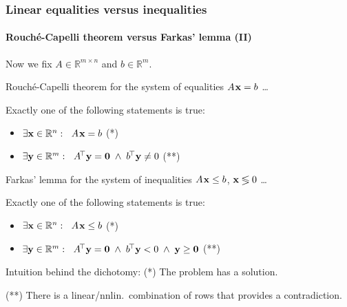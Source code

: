 \documentclass{beamer}
\renewcommand{\.}{\hskip .75pt}
\DeclareMathOperator{\aand}{~\wedge~}
\begin{document}
\begin{frame}
	\frametitle{Linear equalities versus inequalities}
	\framesubtitle{Rouché-Capelli theorem versus Farkas' lemma (II)}
	
	Now we fix $A \in \mathbb{R}^{m \times n}$ and $b \in \mathbb{R}^{m}$.
	\bigskip
	
	{ \color{dred}
		Rouché-Capelli theorem for the system of equalities $A\. \bold{x} = b$ \dots
		
		Exactly one of the following statements is true:
	}
	\begin{itemize} \color{dred}
		\item $\exists \bold{x} \in \mathbb{R}^{n} : \ \; A\. \bold{x} = b$ \hfill\hbox{\footnotesize(*)\:\qquad}
		\item $\exists \bold{y} \in \mathbb{R}^{m} : \ \; A^{\!\top} \bold{y} = \bold{0} \aand b^{\!\top} \bold{y} \neq 0$ \hfill\hbox{\footnotesize(**)\qquad}
	\end{itemize}
	\medskip
	
	{ \color{dblue}
		Farkas' lemma for the system of inequalities $A\. \bold{x} \le b$, $\bold{x} \lessgtr 0$ \dots
		
		Exactly one of the following statements is true:
	}
	\begin{itemize} \color{dblue}
		\item $\exists \bold{x} \in \mathbb{R}^{n} : \ \; A\. \bold{x} \le b$ \hfill\hbox{\footnotesize(*)\:\qquad}
		\item $\exists \bold{y} \in \mathbb{R}^{m} : \ \; A^{\!\top} \bold{y} = \bold{0} \aand b^{\!\top} \bold{y} < 0 \aand \bold{y} \ge \bold{0}$ \hfill\hbox{\footnotesize(**)\qquad}
	\end{itemize}
	\medskip
	
	\footnotesize Intuition behind the dichotomy:\qquad
	(*) The problem has a solution.
	
	(**) There is a linear/nnlin.~combination of rows that provides a contradiction.

\end{frame}
\end{document}
